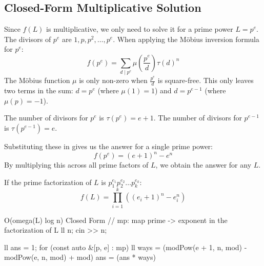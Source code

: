 \documentclass[11pt]{article}
\begin{document}
\subsection{Closed-Form Multiplicative Solution}

\begin{derivation}
    Since $f(L)$ is multiplicative, we only need to solve it for a prime power $L = p^e$.
    The divisors of $p^e$ are $1, p, p^2, \dots, p^e$.
    When applying the Möbius inversion formula for $p^e$:
    \[ f(p^e) = \sum_{d \mid p^e} \mu\left(\frac{p^e}{d}\right) \tau(d)^n \]
    The Möbius function $\mu$ is only non-zero when $\frac{p^e}{d}$ is square-free. This only leaves two terms in the sum: $d = p^e$ (where $\mu(1) = 1$) and $d = p^{e-1}$ (where $\mu(p) = -1$).

    The number of divisors for $p^e$ is $\tau(p^e) = e + 1$.
    The number of divisors for $p^{e-1}$ is $\tau(p^{e-1}) = e$.

    Substituting these in gives us the answer for a single prime power:
    \[ f(p^e) = (e+1)^n - e^n \]
    By multiplying this across all prime factors of $L$, we obtain the answer for any $L$.
\end{derivation}

\begin{resultbox}
    If the prime factorization of $L$ is $p_1^{e_1} p_2^{e_2} \dots p_k^{e_k}$:
    \begin{equation}
        f(L) = \prod_{i=1}^k \left( (e_i + 1)^n - e_i^n \right)
    \end{equation}
\end{resultbox}

\begin{vscode}{O(omega(L) log n) Closed Form}
// mp: map prime -> exponent in the factorization of L
ll n;
cin >> n;

ll ans = 1;
for (const auto &[p, e] : mp)
{
    ll ways = (modPow(e + 1, n, mod) - modPow(e, n, mod) + mod) %
    ans = (ans * ways) %
}
\end{vscode}
\end{document}
